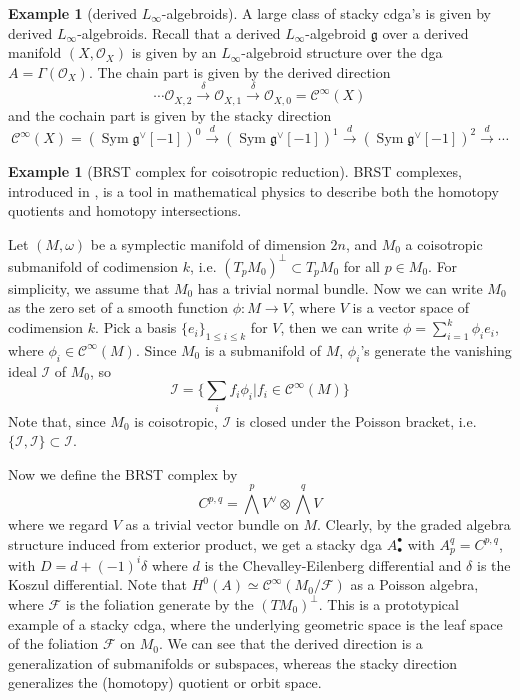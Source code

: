 \documentclass[12pt]{amsart}
\theoremstyle{definition}
\newtheorem{example}[thm]{Example}
\theoremstyle{remark}
\numberwithin{equation}{section}
\newcommand{\CF}{{\mathcal F}}
\newcommand{\CO}{{\mathcal O}}
\newcommand{\cinf}{{\mathcal C}^{\infty}}
\newcommand{\1}{{\mathbb{1}}}
\newcommand{\g}{\mathfrak{g}}
\newcommand{\sym}{\operatorname{Sym}}
\begin{document}
\begin{example}[derived $L_{\infty}$-algebroids]
     A large class of stacky cdga's is given by derived $L_{\infty}$-algebroids. Recall that a derived $L_{\infty}$-algebroid $\g$ over a derived manifold $(X, \CO_X)$ is given by an $L_{\infty}$-algebroid structure over the dga $
     A = \Gamma(\CO_X)$. The chain part is given by the derived direction
     $$
     \cdots \CO_{X,2}\stackrel{\delta}{\to} \CO_{X,1}\stackrel{\delta}{\to} \CO_{X,0} = \cinf(X)
     $$
     and the cochain part is given by the stacky direction
     $$
     \cinf(X) = (\sym \g^{\vee}[-1])^0 \stackrel{d}{\to} (\sym \g^{\vee}[-1])^1 \stackrel{d}{\to} (\sym \g^{\vee}[-1])^2 \stackrel{d}{\to} \cdots
     $$
     
\end{example}
\begin{example}[BRST complex for coisotropic reduction]\label{brst}
    BRST complexes, introduced in \cite{BRS75}\cite{Tyu75}, is a tool in mathematical physics to describe both the homotopy quotients and homotopy intersections.

    Let $(M, \omega)$ be a symplectic manifold of dimension $2n$, and $M_0$ a coisotropic submanifold of codimension $k$, i.e. $(T_p M_0)^{\perp} \subset T_p M_0$ for all $p \in M_0$. For simplicity, we assume that $M_0$ has a trivial normal bundle. Now we can write $M_0$ as the zero set of a smooth function $\phi: M \to V$, where $V$ is a vector space of codimension $k$. Pick a basis $\{e_i\}_{1\le i\le k}$ for $V$, then we can write $\phi = \sum_{i = 1}^k \phi_i e_i$, where $\phi_i \in \cinf(M)$. Since $M_0$ is a submanifold of $M$, $\phi_i$'s generate the vanishing ideal $\mathcal{I}$ of $M_0$, so 
    $$\mathcal{I} = \{\sum_i f_i \phi_i| f_i \in \cinf(M)\}$$
    Note that, since $M_0$ is coisotropic, $\mathcal{I}$ is closed under the Poisson bracket, i.e. $\{ \mathcal{I}, \mathcal{I}\} \subset \mathcal{I}$. 
    
    Now we define the BRST complex by 
    $$
    C^{p,q} = \bigwedge^p V^{\vee} \otimes \bigwedge^q V
    $$
    where we regard $V$ as a trivial vector bundle on $M$.
    Clearly, by the graded algebra structure induced from exterior product, we get a stacky dga $A^{\bullet}_{\bullet}$ with $A^q_p = C^{p, q}$, with $D = d + (-1)^i\delta$ where $d$ is the Chevalley-Eilenberg differential and $\delta$ is the Koszul differential. Note that $H^0(A) \simeq \cinf(M_0/\CF)$ as a Poisson algebra, where $\CF$ is the foliation generate by the $(T M_0)^{\perp}$. This is a prototypical example of a stacky cdga, where the underlying geometric space is the leaf space of the foliation $\CF$ on $M_0$. We can see that the derived direction is a generalization of submanifolds or subspaces, whereas the stacky direction generalizes the (homotopy) quotient or orbit space.
\end{example}
\end{document}
